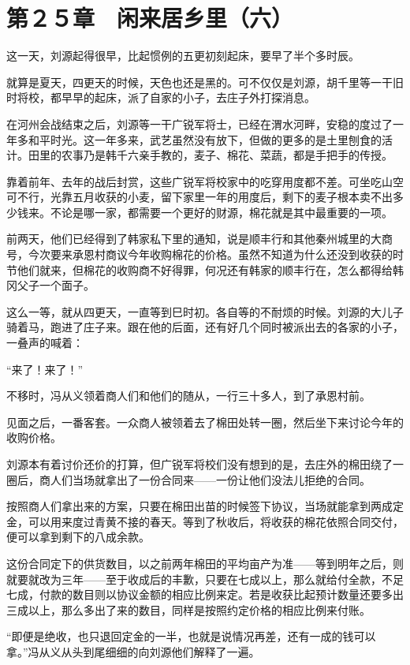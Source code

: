 \section{第２５章　闲来居乡里（六）}

这一天，刘源起得很早，比起惯例的五更初刻起床，要早了半个多时辰。

就算是夏天，四更天的时候，天色也还是黑的。可不仅仅是刘源，胡千里等一干旧时将校，都早早的起床，派了自家的小子，去庄子外打探消息。

在河州会战结束之后，刘源等一干广锐军将士，已经在渭水河畔，安稳的度过了一年多和平时光。这一年多来，武艺虽然没有放下，但做的更多的是土里刨食的活计。田里的农事乃是韩千六亲手教的，麦子、棉花、菜蔬，都是手把手的传授。

靠着前年、去年的战后封赏，这些广锐军将校家中的吃穿用度都不差。可坐吃山空可不行，光靠五月收获的小麦，留下家里一年的用度后，剩下的麦子根本卖不出多少钱来。不论是哪一家，都需要一个更好的财源，棉花就是其中最重要的一项。

前两天，他们已经得到了韩家私下里的通知，说是顺丰行和其他秦州城里的大商号，今次要来承恩村商议今年收购棉花的价格。虽然不知道为什么还没到收获的时节他们就来，但棉花的收购商不好得罪，何况还有韩家的顺丰行在，怎么都得给韩冈父子一个面子。

这么一等，就从四更天，一直等到巳时初。各自等的不耐烦的时候。刘源的大儿子骑着马，跑进了庄子来。跟在他的后面，还有好几个同时被派出去的各家的小子，一叠声的喊着：

“来了！来了！”

不移时，冯从义领着商人们和他们的随从，一行三十多人，到了承恩村前。

见面之后，一番客套。一众商人被领着去了棉田处转一圈，然后坐下来讨论今年的收购价格。

刘源本有着讨价还价的打算，但广锐军将校们没有想到的是，去庄外的棉田绕了一圈后，商人们当场就拿出了一份合同来——一份让他们没法儿拒绝的合同。

按照商人们拿出来的方案，只要在棉田出苗的时候签下协议，当场就能拿到两成定金，可以用来度过青黄不接的春天。等到了秋收后，将收获的棉花依照合同交付，便可以拿到剩下的八成余款。

这份合同定下的供货数目，以之前两年棉田的平均亩产为准——等到明年之后，则就要就改为三年——至于收成后的丰歉，只要在七成以上，那么就给付全款，不足七成，付款的数目则以协议金额的相应比例来定。若是收获比起预计数量还要多出三成以上，那么多出了来的数目，同样是按照约定价格的相应比例来付账。

“即便是绝收，也只退回定金的一半，也就是说情况再差，还有一成的钱可以拿。”冯从义从头到尾细细的向刘源他们解释了一遍。

